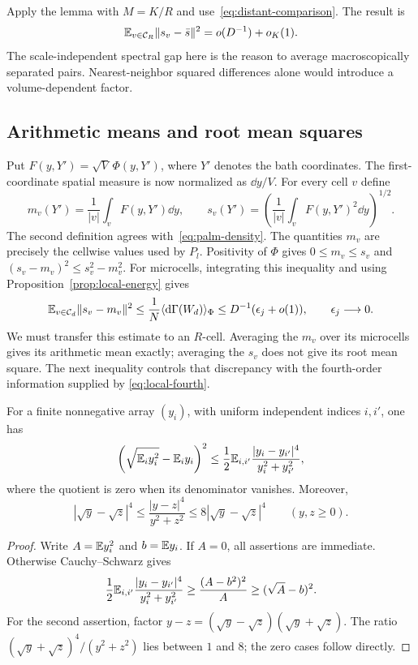 Apply the lemma with $M=K/R$ and use~\eqref{eq:distant-comparison}.
The result is
\begin{equation}\label{eq:rms-variance}
 \mathbb E_{v\in\mathcal C_R}\|s_v-\bar s\|^2=o(D^{-1})+o_K(1).
\end{equation}
The scale-independent spectral gap here is the reason to average
macroscopically separated pairs. Nearest-neighbor squared differences
alone would introduce a volume-dependent factor.

\subsection{Arithmetic means and root mean squares}

Put $F(y,Y')=\sqrt V\,\Phi(y,Y')$, where $Y'$ denotes the bath
coordinates. The first-coordinate spatial measure is now normalized as
$\dd y/V$. For every cell $v$ define
\[
 m_v(Y')=\frac1{|v|}\int_v F(y,Y')\dd y,\qquad
 s_v(Y')=\left(\frac1{|v|}\int_v F(y,Y')^2\dd y\right)^{1/2}.
\]
The second definition agrees with~\eqref{eq:palm-density}. The quantities
$m_v$ are precisely the cellwise values used by $P_l$. Positivity of
$\Phi$ gives $0\le m_v\le s_v$ and
$(s_v-m_v)^2\le s_v^2-m_v^2$. For microcells, integrating this inequality
and using Proposition~\ref{prop:local-energy} gives
\begin{equation}\label{eq:micro-rms}
 \mathbb E_{v\in\mathcal C_d}\|s_v-m_v\|^2
 \le\frac1N\langle\mathrm d\Gamma(W_d)\rangle_\Phi
 \le D^{-1}(\epsilon_j+o(1)),\qquad \epsilon_j\longrightarrow0.
\end{equation}
We must transfer this estimate to an $R$-cell. Averaging the $m_v$ over
its microcells gives its arithmetic mean exactly; averaging the $s_v$
does not give its root mean square. The next inequality controls that
discrepancy with the fourth-order information supplied by
\eqref{eq:local-fourth}.

\begin{lemma}\label{lem:rms-comparison}
For a finite nonnegative array $(y_i)$, with uniform independent indices
$i,i'$, one has
\begin{equation}\label{eq:rms-fourth-inequality}
 \left(\sqrt{\mathbb E_i y_i^2}-\mathbb E_i y_i\right)^2
 \le\frac12\mathbb E_{i,i'}
          \frac{|y_i-y_{i'}|^4}{y_i^2+y_{i'}^2},
\end{equation}
where the quotient is zero when its denominator vanishes. Moreover,
\begin{equation}\label{eq:square-root-quotient}
 |\sqrt y-\sqrt z|^4\le\frac{|y-z|^4}{y^2+z^2}
 \le8|\sqrt y-\sqrt z|^4\qquad(y,z\ge0).
\end{equation}
\end{lemma}
\begin{proof}
Write $A=\mathbb E y_i^2$ and $b=\mathbb E y_i$. If $A=0$, all assertions are
immediate. Otherwise Cauchy--Schwarz gives
\[
 \frac12\mathbb E_{i,i'}\frac{|y_i-y_{i'}|^4}{y_i^2+y_{i'}^2}
 \ge\frac{(A-b^2)^2}{A}
 \ge(\sqrt A-b)^2.
\]
For the second assertion, factor $y-z=(\sqrt y-\sqrt z)(\sqrt y+\sqrt z)$.
The ratio $(\sqrt y+\sqrt z)^4/(y^2+z^2)$ lies between $1$ and $8$;
the zero cases follow directly.
\end{proof}

